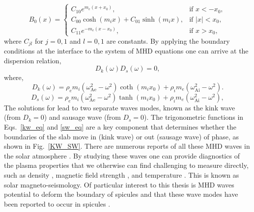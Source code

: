 \begin{equation}
        B_0(x) = 
    \begin{cases}
      C_{10} e^{m_e (x+x_0)}, &  \text{if } x < -x_0, \\
      C_{00} \cosh{(m_i x)} + C_{01} \sinh{(m_i x)}, & \text{if } |x| < x_0, \\
      C_{11} e^{-m_e(x-x_0)}, & \text{if } x > x_0,
    \end{cases}
\end{equation}
where $C_{jl}$ for $j=0,1$ and $l=0,1$ are constants. By applying the boundary conditions at the interface to the system of MHD equations one can arrive at the dispersion relation,
\begin{equation}\label{disp_saus_kink}
    D_k(\omega)D_s(\omega)  = 0,
\end{equation}
where,
\begin{equation}\label{kw_eq}
    D_k(\omega) = \rho_em_i(\omega_\textrm{Ae}^2 - \omega^2)\coth{(m_ix_0)} + \rho_im_e(\omega_\textrm{Ai}^2 - \omega^2).
\end{equation}
\begin{equation}\label{sw_eq}
    D_s(\omega) = \rho_em_i(\omega_\textrm{Ae}^2 - \omega^2)\tanh{(m_ix_0)} + \rho_im_e(\omega_\textrm{Ai}^2 - \omega^2),
\end{equation}
The solutions for  lead to two separate waves modes, known as the kink wave (from $D_k =0$) and sausage wave (from $D_s =0$). The trigonometric functions in Eqs.~\eqref{kw_eq} and \eqref{sw_eq} are a key component that determines whether the boundaries of the slab move in (kink wave) or out (sausage wave) of phase, as shown in Fig.~\ref{KW_SW}. \np
%
There are numerous reports of all these MHD waves in the solar atmosphere \citep{Tomczyk2007Sci3171192T, Tomczyk2009ApJ6971384T, jess_alfven_2009, Morton2012NatCo31315M}. By studying these waves one can provide diagnostics of the plasma properties that we otherwise can find challenging to measure directly, such as density \citep{Verwichte_2013A_A}, magnetic field strength \citep{Nakariakov_2001}, and temperature \citep{De_Moortel_2003SoPh}. This is known as solar magneto-seismology. Of particular interest to this thesis is MHD waves potential to deform the boundary of spicules and that these wave modes have been reported to occur in spicules \citep{Kukhianidze2006AA, Okamoto2011ApJ736L24O, Jess2012ApJ744L5J, Verth2016GMS216431V, Sharma2018ApJ85361S}.
